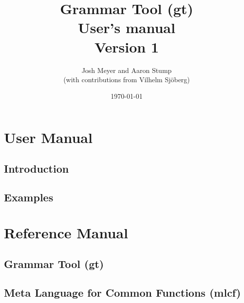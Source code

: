 \documentclass{report}
\begin{document}
\date{}
\title{
{\Huge \bf Grammar Tool (gt)}\\
{User's manual}\\
{Version 1}\\
}

\author{
Josh Meyer and Aaron Stump\\
{(with contributions from Vilhelm Sj\"{o}berg)}
}

\date{\today}
\maketitle

\tableofcontents

\part{User Manual}

\chapter{Introduction}


\chapter{Examples}


\part{Reference Manual}

\chapter{Grammar Tool (gt)}


\chapter{Meta Language for Common Functions (mlcf)}

\end{document}
